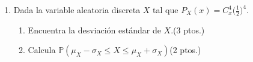 \documentclass[a4paper,11pt]{report}
\begin{document}
\begin{enumerate}
\item Dada la variable aleatoria discreta $X$ tal que $\displaystyle P_X(x)=C_x^4\big(\frac{1}{2}\big)^4 $.
\begin{enumerate}
	\item Encuentra la desviaci\'on est\'andar de $X$.\hfill{(3 ptos.)}
	\item Calcula $\mathbb{P}(\mu_X-\sigma_X\leq X \leq \mu_X+\sigma_X)$\hfill{(2 ptos.)}
\end{enumerate}


\end{enumerate}
\end{document}
